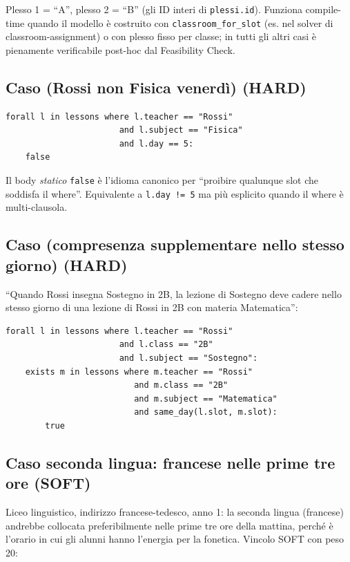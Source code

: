 Plesso 1 = ``A'', plesso 2 = ``B'' (gli ID interi di
\texttt{plessi.id}). Funziona compile-time quando il modello \`e
costruito con \texttt{classroom\_for\_slot} (es. nel solver di
classroom-assignment) o con plesso fisso per classe; in tutti
gli altri casi \`e pienamente verificabile post-hoc dal
Feasibility Check.

\subsection{Caso (Rossi non Fisica venerd\`i) (HARD)}

\begin{lstlisting}
forall l in lessons where l.teacher == "Rossi"
                       and l.subject == "Fisica"
                       and l.day == 5:
    false
\end{lstlisting}

Il body \emph{statico} \texttt{false} \`e l'idioma canonico per
``proibire qualunque slot che soddisfa il where''. Equivalente a
\texttt{l.day != 5} ma pi\`u esplicito quando il where \`e
multi-clausola.

\subsection{Caso (compresenza supplementare nello stesso
giorno) (HARD)}

``Quando Rossi insegna Sostegno in 2B, la lezione di Sostegno
deve cadere nello stesso giorno di una lezione di Rossi in 2B
con materia Matematica'':
\begin{lstlisting}
forall l in lessons where l.teacher == "Rossi"
                       and l.class == "2B"
                       and l.subject == "Sostegno":
    exists m in lessons where m.teacher == "Rossi"
                          and m.class == "2B"
                          and m.subject == "Matematica"
                          and same_day(l.slot, m.slot):
        true
\end{lstlisting}

\subsection{Caso seconda lingua: francese nelle prime tre ore (SOFT)}

Liceo linguistico, indirizzo francese-tedesco, anno 1: la
seconda lingua (francese) andrebbe collocata preferibilmente
nelle prime tre ore della mattina, perch\'e \`e l'orario in cui
gli alunni hanno l'energia per la fonetica. Vincolo SOFT con
peso 20:

